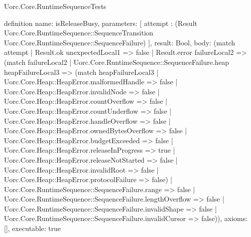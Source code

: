 \begin{lexlean}{Uorc.Core.RuntimeSequenceTests}
\begin{semanticmodule}
definition{
  name: isReleaseBusy,
  parameters: [
    attempt : (Result Uorc.Core.RuntimeSequence::SequenceTransition Uorc.Core.RuntimeSequence::SequenceFailure)
  ],
  result: Bool,
  body: (match attempt
    | Result.ok unexpectedLocal1 => false
    | Result.error failureLocal2 => (match failureLocal2
      | Uorc.Core.RuntimeSequence::SequenceFailure.heap heapFailureLocal3 => (match heapFailureLocal3
        | Uorc.Core.Heap::HeapError.malformedHandle => false
        | Uorc.Core.Heap::HeapError.invalidNode => false
        | Uorc.Core.Heap::HeapError.countOverflow => false
        | Uorc.Core.Heap::HeapError.countUnderflow => false
        | Uorc.Core.Heap::HeapError.handleOverflow => false
        | Uorc.Core.Heap::HeapError.ownedBytesOverflow => false
        | Uorc.Core.Heap::HeapError.budgetExceeded => false
        | Uorc.Core.Heap::HeapError.releaseInProgress => true
        | Uorc.Core.Heap::HeapError.releaseNotStarted => false
        | Uorc.Core.Heap::HeapError.invalidRoot => false
        | Uorc.Core.Heap::HeapError.protocolFailure => false)
      | Uorc.Core.RuntimeSequence::SequenceFailure.range => false
      | Uorc.Core.RuntimeSequence::SequenceFailure.lengthOverflow => false
      | Uorc.Core.RuntimeSequence::SequenceFailure.invalidShape => false
      | Uorc.Core.RuntimeSequence::SequenceFailure.invalidCursor => false)),
  axioms: [],
  executable: true
}


\end{semanticmodule}
\end{lexlean}
